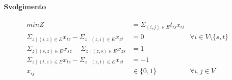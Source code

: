 \paragraph{Svolgimento}

\begin{align*}
    min Z &= \Sigma _{(i,j) \in E} t_{ij} x_{ij} \\
    \Sigma _{z \mid (i,z) \in E} x_{iz} - \Sigma _{z \mid (z,i) \in E} x_{zi} &= 0 &\forall i \in V \setminus \{s,t\} \\
    \Sigma _{z \mid (s,z) \in E} x_{sz} - \Sigma _{z \mid (z,s) \in E} x_{zs} &= 1 \\
    \Sigma _{z \mid (t,z) \in E} x_{tz} - \Sigma _{z \mid (z,t) \in E} x_{zt} &= -1 \\
    x_{ij} &\in \{0,1\} &\forall i,j \in V
\end{align*}
